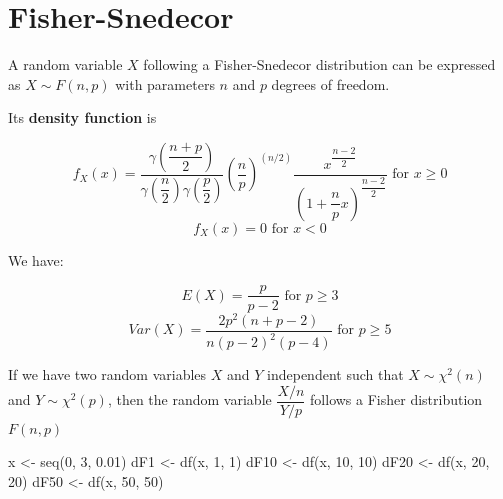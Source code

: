 \documentclass[
  letterpaper,
  DIV=11,
  numbers=noendperiod]{scrreprt}
\newenvironment{Shaded}{\begin{snugshade}}{\end{snugshade}}
\newcommand{\DecValTok}[1]{\textcolor[rgb]{0.68,0.00,0.00}{#1}}
\newcommand{\FloatTok}[1]{\textcolor[rgb]{0.68,0.00,0.00}{#1}}
\newcommand{\FunctionTok}[1]{\textcolor[rgb]{0.28,0.35,0.67}{#1}}
\newcommand{\NormalTok}[1]{\textcolor[rgb]{0.00,0.23,0.31}{#1}}
\newcommand{\OtherTok}[1]{\textcolor[rgb]{0.00,0.23,0.31}{#1}}
\begin{document}
\section{Fisher-Snedecor}\label{fisher-snedecor}

A random variable \(X\) following a Fisher-Snedecor distribution can be
expressed as \(X \sim F(n, p)\) with parameters \(n\) and \(p\) degrees
of freedom.

Its \textbf{density function} is

\[f_X(x) = \dfrac {\gamma(\dfrac{n+p}{2})} {\gamma(\dfrac{n}{2}) \gamma(\dfrac{p}{2})} (\dfrac{n}{p})^{(n/2)} \dfrac{x^{\dfrac{n-2}{2}}}{(1 + \dfrac{n}{p}x)^{\dfrac{n-2}{2}}} \text{ for } x \geq 0\]
\[f_X(x) = 0 \text{ for } x < 0\]

We have:

\[E(X) = \dfrac{p}{p-2} \text{ for } p \ge 3\]
\[Var(X) = \dfrac{2p^2(n+p-2)}{n(p-2)^2(p-4)} \text{ for } p \ge 5\]

If we have two random variables \(X\) and \(Y\) independent such that
\(X \sim \chi^2(n)\) and \(Y \sim \chi^2(p)\), then the random variable
\(\dfrac{X/n}{Y/p}\) follows a Fisher distribution \(F(n, p)\)

\begin{Shaded}
\begin{Highlighting}[]
\NormalTok{x }\OtherTok{\textless{}{-}} \FunctionTok{seq}\NormalTok{(}\DecValTok{0}\NormalTok{, }\DecValTok{3}\NormalTok{, }\FloatTok{0.01}\NormalTok{)}
\NormalTok{dF1 }\OtherTok{\textless{}{-}} \FunctionTok{df}\NormalTok{(x, }\DecValTok{1}\NormalTok{, }\DecValTok{1}\NormalTok{)}
\NormalTok{dF10 }\OtherTok{\textless{}{-}} \FunctionTok{df}\NormalTok{(x, }\DecValTok{10}\NormalTok{, }\DecValTok{10}\NormalTok{)}
\NormalTok{dF20 }\OtherTok{\textless{}{-}} \FunctionTok{df}\NormalTok{(x, }\DecValTok{20}\NormalTok{, }\DecValTok{20}\NormalTok{)}
\NormalTok{dF50 }\OtherTok{\textless{}{-}} \FunctionTok{df}\NormalTok{(x, }\DecValTok{50}\NormalTok{, }\DecValTok{50}\NormalTok{)}
\end{Highlighting}
\end{Shaded}
\end{document}
